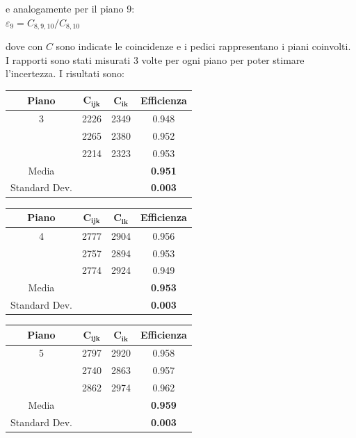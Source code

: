 \documentclass[11pt]{article}
\begin{document}
e analogamente per il piano 9: \\

$
\varepsilon_9 = C_{8,9,10}/C_{8,10}
$

dove con $C$ sono indicate le coincidenze e i pedici rappresentano i piani coinvolti. I
rapporti sono stati misurati 3 volte per ogni piano per poter stimare l'incertezza. I risultati sono: \\
\vspace{1 cm}

\begin{tabular}{|c|c|c|c|}
\hline 
\textbf{Piano} & $\mathbf{C_{ijk}}$ & $\mathbf{C_{ik}}$ & \textbf{Efficienza} \\ 
\hline 
3 & 2226 & 2349 & 0.948 \\ 
\hline 
\hphantom & 2265 & 2380 & 0.952 \\ 
\hline 
\hphantom & 2214 & 2323 & 0.953 \\ 
\hline 
Media & \hphantom & \hphantom & \textbf{0.951} \\ 
\hline 
Standard Dev. & \hphantom & \hphantom & \textbf{0.003} \\ 
\hline 
\end{tabular} 

\begin{tabular}{|c|c|c|c|}
\hline 
\textbf{Piano} & $\mathbf{C_{ijk}}$ & $\mathbf{C_{ik}}$ & \textbf{Efficienza} \\
\hline 
4 & 2777 & 2904 & 0.956 \\ 
\hline 
\hphantom & 2757 & 2894 & 0.953 \\ 
\hline 
\hphantom & 2774 & 2924 & 0.949 \\ 
\hline 
Media & \hphantom & \hphantom & \textbf{0.953} \\ 
\hline 
Standard Dev. & \hphantom & \hphantom & \textbf{0.003} \\ 
\hline 
\end{tabular} 

\begin{tabular}{|c|c|c|c|}
\hline 
\textbf{Piano} & $\mathbf{C_{ijk}}$ & $\mathbf{C_{ik}}$ & \textbf{Efficienza} \\
\hline 
5 & 2797 & 2920 & 0.958 \\ 
\hline 
\hphantom & 2740 & 2863 & 0.957 \\ 
\hline 
\hphantom & 2862 & 2974 & 0.962 \\ 
\hline 
Media & \hphantom & \hphantom & \textbf{0.959} \\ 
\hline 
Standard Dev. & \hphantom & \hphantom & \textbf{0.003} \\ 
\hline 
\end{tabular} 
\vspace{0.8 cm}
\end{document}
